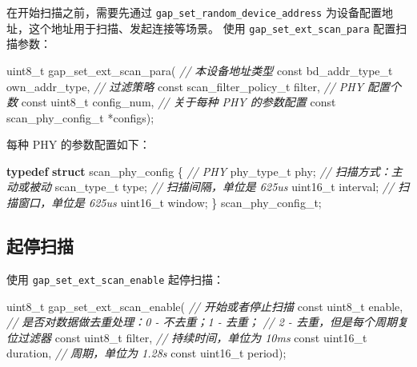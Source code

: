 \documentclass[
  12pt,
]{book}
\newenvironment{Shaded}{\begin{snugshade}}{\end{snugshade}}
\newcommand{\CommentTok}[1]{\textcolor[rgb]{0.56,0.35,0.01}{\textit{#1}}}
\newcommand{\DataTypeTok}[1]{\textcolor[rgb]{0.13,0.29,0.53}{#1}}
\newcommand{\KeywordTok}[1]{\textcolor[rgb]{0.13,0.29,0.53}{\textbf{#1}}}
\newcommand{\NormalTok}[1]{#1}
\begin{document}
在开始扫描之前，需要先通过 \texttt{gap\_set\_random\_device\_address} 为设备配置地址，这个地址用于扫描、发起连接等场景。
使用 \texttt{gap\_set\_ext\_scan\_para} 配置扫描参数：

\begin{Shaded}
\begin{Highlighting}[]
\DataTypeTok{uint8_t}\NormalTok{ gap_set_ext_scan_para(}
  \CommentTok{// 本设备地址类型}
  \DataTypeTok{const}\NormalTok{ bd_addr_type_t own_addr_type,}
  \CommentTok{// 过滤策略}
  \DataTypeTok{const}\NormalTok{ scan_filter_policy_t filter,}
  \CommentTok{// PHY 配置个数}
  \DataTypeTok{const} \DataTypeTok{uint8_t}\NormalTok{ config_num,}
  \CommentTok{// 关于每种 PHY 的参数配置}
  \DataTypeTok{const}\NormalTok{ scan_phy_config_t *configs);}
\end{Highlighting}
\end{Shaded}

每种 PHY 的参数配置如下：

\begin{Shaded}
\begin{Highlighting}[]
\KeywordTok{typedef} \KeywordTok{struct}\NormalTok{ scan_phy_config}
\NormalTok{\{}
    \CommentTok{// PHY}
\NormalTok{    phy_type_t phy;}
    \CommentTok{// 扫描方式：主动或被动}
\NormalTok{    scan_type_t type;}
    \CommentTok{// 扫描间隔，单位是 625us}
    \DataTypeTok{uint16_t}\NormalTok{ interval;}
    \CommentTok{// 扫描窗口，单位是 625us}
    \DataTypeTok{uint16_t}\NormalTok{ window;}
\NormalTok{\} scan_phy_config_t;}
\end{Highlighting}
\end{Shaded}

\hypertarget{ux8d77ux505cux626bux63cf}{%
\subsection{起停扫描}\label{ux8d77ux505cux626bux63cf}}

使用 \texttt{gap\_set\_ext\_scan\_enable} 起停扫描：

\begin{Shaded}
\begin{Highlighting}[]
\DataTypeTok{uint8_t}\NormalTok{ gap_set_ext_scan_enable(}
  \CommentTok{// 开始或者停止扫描}
  \DataTypeTok{const} \DataTypeTok{uint8_t}\NormalTok{ enable,}
  \CommentTok{// 是否对数据做去重处理：0 - 不去重；1 - 去重；}
  \CommentTok{//                       2 - 去重，但是每个周期复位过滤器}
  \DataTypeTok{const} \DataTypeTok{uint8_t}\NormalTok{ filter,}
  \CommentTok{// 持续时间，单位为 10ms}
  \DataTypeTok{const} \DataTypeTok{uint16_t}\NormalTok{ duration,}
  \CommentTok{// 周期，单位为 1.28s}
  \DataTypeTok{const} \DataTypeTok{uint16_t}\NormalTok{ period);}
\end{Highlighting}
\end{Shaded}
\end{document}
